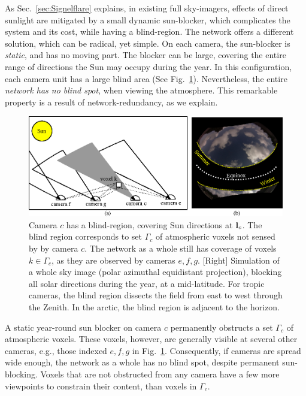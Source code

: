 \documentclass[runningheads]{llncs}
\begin{document}
As Sec.~\ref{sec:Signelflare} explains, in existing full sky-imagers, effects of direct sunlight are mitigated by a small dynamic sun-blocker, which complicates the system and its cost, while having a blind-region. The network offers a different solution, which can be radical, yet simple. On each camera, the sun-blocker is {\em static}, and has no moving part. The blocker can be large, covering the entire range of directions the Sun may occupy during the year. In this configuration, each camera unit has a large blind area (See Fig.~\ref{fig:blindspot}). Nevertheless, the entire {\em network has no blind spot}, when viewing the atmosphere. This remarkable property is a result of network-redundancy, as we explain.
\begin{figure}[t!]
\begin{center}
   \includegraphics[width=0.8\linewidth]{figures/sun_blocks.eps}
\end{center}
   \vspace{-0.6cm}
   \caption{Camera $c$ has a blind-region, covering Sun directions at ${\bf l}_c$. The blind region corresponds to set $\Gamma_c$ of atmospheric voxels not sensed by by camera $c$. The network as a whole still has coverage of voxels $k\in\Gamma_c$, as they are observed by cameras $e,f,g$.
   [Right] Simulation of a whole sky image (polar azimuthal equidistant projection), blocking
   all solar directions during the year, at a mid-latitude. For tropic cameras, the blind region dissects the field from east to west through the Zenith. In the arctic, the blind region is adjacent to the horizon.
   }
\label{fig:blindspot}
\end{figure}


A static year-round sun blocker on camera $c$ permanently obstructs a set $\Gamma_c$ of atmospheric voxels. These voxels, however, are generally visible at several other cameras, e.g., those indexed $e,f,g$ in Fig.~\ref{fig:blindspot}. Consequently, if cameras are spread wide enough, the network as a whole has no blind spot, despite permanent sun-blocking. Voxels that are not obstructed from any camera have a few more viewpoints to constrain their content, than voxels in $\Gamma_c$.
\end{document}
